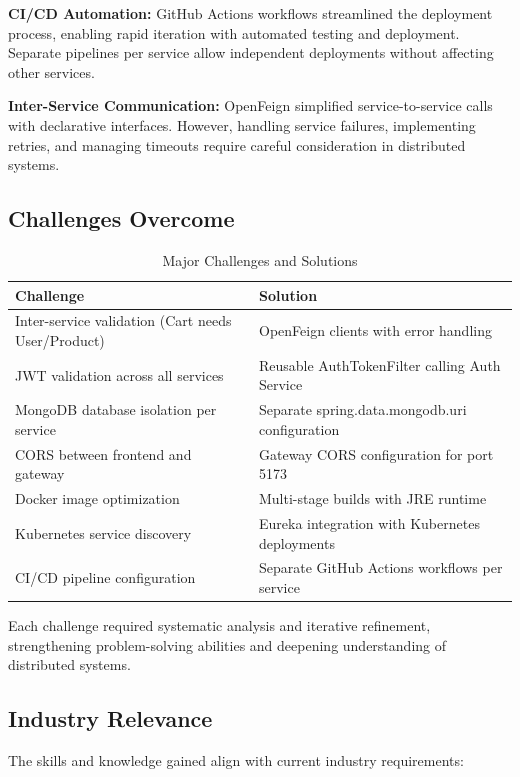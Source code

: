 \textbf{CI/CD Automation:} GitHub Actions workflows streamlined the deployment process, enabling rapid iteration with automated testing and deployment. Separate pipelines per service allow independent deployments without affecting other services.

\textbf{Inter-Service Communication:} OpenFeign simplified service-to-service calls with declarative interfaces. However, handling service failures, implementing retries, and managing timeouts require careful consideration in distributed systems.

\subsection{Challenges Overcome}

\begin{table}[h!]
\centering
\caption{Major Challenges and Solutions}
\begin{tabular}{|p{4cm}|p{4cm}|}
\hline
\textbf{Challenge} & \textbf{Solution} \\
\hline
Inter-service validation (Cart needs User/Product) & OpenFeign clients with error handling \\
\hline
JWT validation across all services & Reusable AuthTokenFilter calling Auth Service \\
\hline
MongoDB database isolation per service & Separate spring.data.mongodb.uri configuration \\
\hline
CORS between frontend and gateway & Gateway CORS configuration for port 5173 \\
\hline
Docker image optimization & Multi-stage builds with JRE runtime \\
\hline
Kubernetes service discovery & Eureka integration with Kubernetes deployments \\
\hline
CI/CD pipeline configuration & Separate GitHub Actions workflows per service \\
\hline
\end{tabular}
\end{table}

Each challenge required systematic analysis and iterative refinement, strengthening problem-solving abilities and deepening understanding of distributed systems.

\subsection{Industry Relevance}

The skills and knowledge gained align with current industry requirements:

